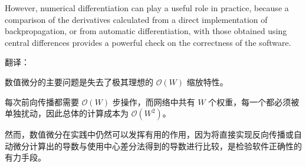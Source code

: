 \documentclass{article}
\begin{document}
However, numerical differentiation can play a useful role in practice, because a comparison of the derivatives calculated from a direct implementation of backpropagation, or from automatic differentiation, with those obtained using central differences provides a powerful check on the correctness of the software.

{\color{red}
翻译：

数值微分的主要问题是失去了极其理想的 $\mathcal{O}(W)$ 缩放特性。

每次前向传播都需要 $\mathcal{O}(W)$ 步操作，而网络中共有 $W$ 个权重，每一个都必须被单独扰动，因此总体的计算成本为 $\mathcal{O}(W^2)$。

然而，数值微分在实践中仍然可以发挥有用的作用，因为将直接实现反向传播或自动微分计算出的导数与使用中心差分法得到的导数进行比较，是检验软件正确性的有力手段。
}
\end{document}
